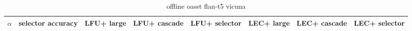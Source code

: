 \begin{table}[ht]
\begin{center}
\begin{tabular}{ cp{3.5em}p{3.2em}p{3.2em}p{3.2em}p{3.2em}p{3.2em}p{3.2em} }
  \toprule
  $\alpha$ & selector accuracy & LFU+ large & LFU+ cascade & LFU+ selector & LEC+ large & LEC+ cascade & LEC+ selector \\ 
  \bottomrule
\end{tabular}
\end{center}
\caption{offline oasst flan-t5 vicuna}
\label{tab:offline_oasst_flan-t5_vicuna}
\end{table}
